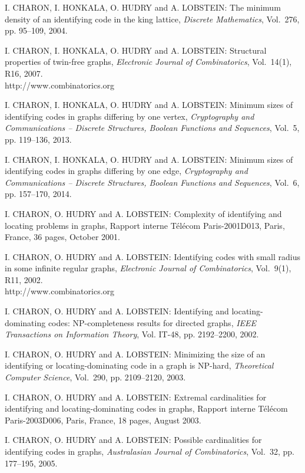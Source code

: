 \begin{thebibliography}{999}
I. CHARON, I. HONKALA, O. HUDRY and A. LOBSTEIN: The minimum density of an identifying code in the king lattice, {\it Discrete Mathematics}, Vol.~276, pp. 95--109, 2004.

I. CHARON, I. HONKALA, O. HUDRY and A. LOBSTEIN: Structural properties of twin-free graphs, {\it Electronic Journal of Combinatorics}, Vol.~14(1), R16, 2007.\\
http://www.combinatorics.org

I. CHARON, I. HONKALA, O. HUDRY and A. LOBSTEIN: Minimum sizes of identifying codes in graphs differing by one vertex, {\it Cryptography and Communications -- Discrete Structures, Boolean Functions and Sequences}, Vol.~5, pp. 119--136, 2013.

I. CHARON, I. HONKALA, O. HUDRY and A. LOBSTEIN: Minimum sizes of identifying codes in graphs differing by one edge, {\it Cryptography and Communications -- Discrete Structures, Boolean Functions and Sequences}, Vol.~6, pp. 157--170, 2014.

I. CHARON, O. HUDRY and A. LOBSTEIN: Complexity of identifying and locating problems in graphs, Rapport interne T\'el\'ecom Paris-2001D013, Paris, France, 36 pages, October 2001.

I. CHARON, O. HUDRY and A. LOBSTEIN: Identifying codes with small radius in some infinite regular graphs, {\it Electronic Journal of Combinatorics}, Vol.~9(1), R11, 2002.\\
http://www.combinatorics.org

I. CHARON, O. HUDRY and A. LOBSTEIN: Identifying and locating-dominating codes: NP-completeness results for directed graphs, {\it IEEE Transactions on Information Theory}, Vol. IT-48, pp. 2192--2200, 2002.

I. CHARON, O. HUDRY and A. LOBSTEIN: Minimizing the size of an identifying or locating-dominating code in a graph is NP-hard, {\it Theoretical Computer Science}, Vol.~290, pp. 2109--2120, 2003.

I. CHARON, O. HUDRY and A. LOBSTEIN: Extremal cardinalities for identifying and locating-dominating codes in graphs, Rapport interne T\'el\'ecom Paris-2003D006, Paris, France, 18 pages, August 2003.

I. CHARON, O. HUDRY and A. LOBSTEIN: Possible cardinalities for identifying codes in graphs, {\it Australasian Journal of Combinatorics}, Vol.~32, pp. 177--195, 2005.


\end{thebibliography}
